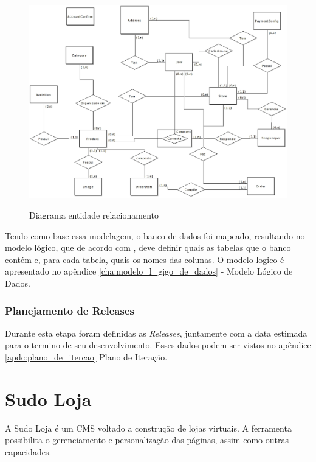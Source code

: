 \documentclass[a4paper,12pt]{monografia}
\begin{document}
\begin{figure}[H]
\centering
\caption{Diagrama entidade relacionamento}
\centering
\includegraphics[width=15cm]{img/diagramas/der.eps}\\
\label{fig:der}
\end{figure}

Tendo como base essa modelagem, o banco de dados foi mapeado, resultando no modelo lógico, que de acordo com , deve definir quais as tabelas que o banco contém e, para cada tabela, quais os nomes das colunas. O modelo logico é apresentado no apêndice \ref{cha:modelo_l_gigo_de_dados} - Modelo Lógico de Dados.

\subsection{Planejamento de Releases} %
\label{sub:planejamento_de_releases}

Durante esta etapa foram definidas as \textit{Releases}, juntamente com a data estimada para o termino de seu desenvolvimento. Esses dados podem ser vistos no apêndice \ref{apdc:plano_de_itercao} Plano de Iteração.



\chapter{Sudo Loja} %
\label{cha:sudoloja}

A Sudo Loja é um CMS voltado a construção de lojas virtuais. A ferramenta possibilita o gerenciamento e personalização das páginas, assim como outras capacidades.
\end{document}
